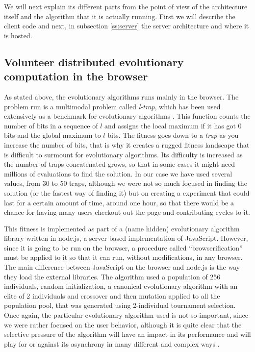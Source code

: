 \documentclass{sig-alternate}
\begin{document}
We will next explain its different parts from the point of
view of the architecture itself and the algorithm that it is actually
running. First we will describe the client code and next, in
subsection \ref{ss:server} the server architecture and where it is
hosted. 

\subsection{Volunteer distributed evolutionary computation in the
  browser}

As stated above, the evolutionary algorithms runs mainly in the
browser. The problem run is a multimodal problem called {\em l-trap},
which has been used extensively as a benchmark for evolutionary
algorithms \cite{fernandes2009using,nijssen2003analysis}. This
function counts the number of bits in a sequence of $l$ and assigns
the local maximum if it has got 0 bits and the global maximum to $l$
bits. The fitness goes down to a {\em trap} as you increase the number
of bits, that is why it creates a rugged fitness landscape that is
difficult to surmount for evolutionary algorithms. Its difficulty is
increased as the number of traps concatenated grows, so that in some
cases it might need millions of evaluations to find the solution. In
our case we have used several values, from 30 to 50 traps, although we
were not so much focused in finding the solution (or the fastest way
of finding it) but on creating a experiment that could last for a
certain amount of time, around one hour, so that there would be a
chance for having many users checkout out the page and contributing
cycles to it. 

This fitness is implemented as part of a (name hidden) evolutionary
algorithm library written in node.js, a server-based implementation of
JavaScript. However, since it is going to be run on the browser, a
procedure called ``browserification'' must be applied to it so that it
can run, without modifications, in any browser. The main difference
between JavaScript on the browser and node.js is the way they load the
external libraries. The algorithm used a population of 256
individuals, random initialization, a canonical evolutionary algorithm
with an elite of 2 individuals and crossover and then mutation applied
to all the population pool, that was generated using 2-individual
tournament selection. Once again, the particular evolutionary
algorithm used is not so important, since we were rather focused on
the user behavior, although it is quite clear that the selective
pressure of the algorithm will have an impact in its performance and
will play for or against its asynchrony in many different and complex
ways \cite{jj:2008:PPSN}. %
\end{document}
